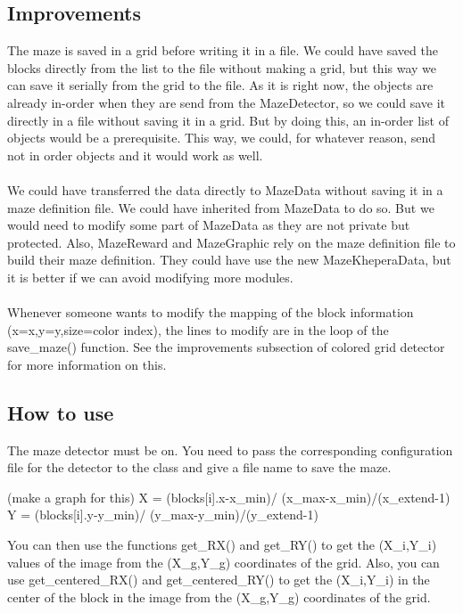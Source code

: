 \subsection{Improvements}

The maze is saved in a grid before writing it in a file. We could have 
saved the blocks directly from the list to the file without making a 
grid, but this way we can save it serially from the grid to the file. 
As it is right now, the objects are already in-order when they are 
send from the MazeDetector, so we could save it directly in a file 
without saving it in a grid. But by doing this, an in-order list of 
objects would be a prerequisite. This way, we could, for whatever 
reason, send not in order objects and it would work as well. 
\\
\\
We could have transferred the data directly to MazeData without saving 
it in a maze definition file. We could have inherited from MazeData 
to do so. But we would need to modify some part of MazeData as they 
are not private but protected. Also, MazeReward and MazeGraphic rely 
on the maze definition file to build their maze definition. They could 
have use the new MazeKheperaData, but it is better if we can avoid 
modifying more modules.
\\
\\
Whenever someone wants to modify the mapping of the block information 
(x=x,y=y,size=color index), the lines to modify are in the loop of 
the save\_maze() function. See the improvements subsection of colored 
grid detector for more information on this.

\subsection{How to use}

The maze detector must be on. You need to pass the corresponding 
configuration file for the detector to the class and give a file name 
to save the maze. 

                    (make a graph for this)
                    X = (blocks[i].x-x\_min)/ (x\_max-x\_min)/(x\_extend-1)
                    Y = (blocks[i].y-y\_min)/ (y\_max-y\_min)/(y\_extend-1)

You can then use the functions get\_RX() and get\_RY() to get the (X\_i,Y\_i) 
values of the image from the (X\_g,Y\_g) coordinates of the grid. Also, 
you can use get\_centered\_RX() and get\_centered\_RY() to get the (X\_i,Y\_i) 
in the center of the block in the image from the (X\_g,Y\_g) coordinates 
of the grid.
